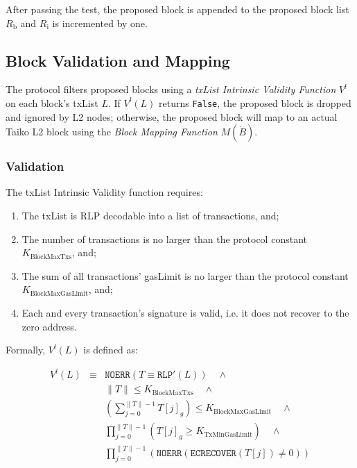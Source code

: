 \documentclass[9pt,oneside]{amsart}
\begin{document}
\begin{multicols}{2}
After passing the test, the proposed block is appended to the proposed block list $R_\mathrm{b}$ and $R_\mathrm{i}$ is incremented by one.

\subsection{Block Validation and Mapping } \label{sec:filtermap}
The protocol filters proposed blocks using a \emph{txList Intrinsic Validity Function} $V^l$ on each block's txList $L$. If $V^l(L)$ returns \texttt{False}, the proposed block is dropped and ignored by L2 nodes; otherwise, the proposed block will map to an actual Taiko L2 block using the \emph{Block Mapping Function} $M(\dot{B})$.

\subsubsection{Validation} The txList Intrinsic Validity function requires:

\begin{enumerate}
\item The txList is RLP decodable into a list of transactions, and;
\item The number of transactions is no larger than the protocol constant $ K_{\mathrm{BlockMaxTxs}}$, and;
\item The sum of all transactions' gasLimit is no larger than the protocol constant $K_{\mathrm{BlockMaxGasLimit}}$, and;
\item Each and every transaction's signature is valid, i.e. it does not recover to the zero address.
\end{enumerate}

Formally, $V^l(L)$ is defined as:

\begin{eqnarray}
V^l(L) & \equiv & \texttt{NOERR}(T \equiv \texttt{RLP}'(L))  \quad \wedge  \\
\nonumber& & \lVert T \rVert \le K_{\mathrm{BlockMaxTxs}} \quad \wedge \\
\nonumber & & (\sum_{j = 0}^{\lVert T \rVert - 1}T[j]_g) \le K_{\mathrm{BlockMaxGasLimit}} \quad \wedge \\
\nonumber & & \prod_{j = 0}^{\lVert T \rVert - 1} (T[j]_g \ge K_{\mathrm{TxMinGasLimit}})\quad \wedge \\
\nonumber & & \prod_{j = 0}^{\lVert T \rVert - 1} (\texttt{NOERR}(\texttt{ECRECOVER}(T[j]) \ne 0) )
\end{eqnarray}


\end{multicols}
\end{document}
